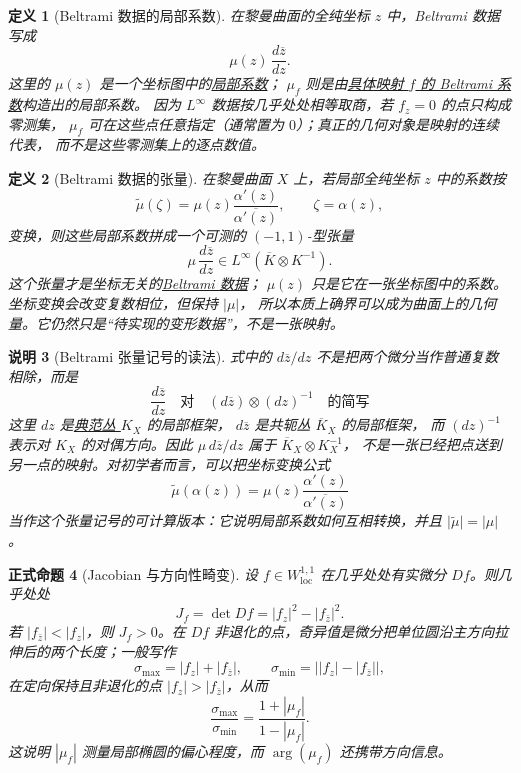 \documentclass[UTF8,fontset=none,a4paper,11pt]{ctexart}
\theoremstyle{foundation-definition}
\newtheorem{definition}{定义}[section]
\theoremstyle{foundation-theorem}
\theoremstyle{foundation-proposition}
\newtheorem{proposition}[definition]{正式命题}
\theoremstyle{foundation-example}
\theoremstyle{foundation-remark}
\newtheorem{remark}[definition]{说明}
\theoremstyle{foundation-theorem}
\newcommand{\term}[2]{\hyperref[#1]{#2}}
\begin{document}
\begin{definition}[Beltrami 数据的局部系数]\label{def:beltrami-differential}
在黎曼曲面的全纯坐标 \(z\) 中，Beltrami 数据写成
\[
\mu(z)\,\frac{d\overline z}{dz}.
\]
这里的 \(\mu(z)\) 是一个坐标图中的\term{def:beltrami-differential}{局部系数}；
\(\mu_f\) 则是由\term{def:map-beltrami-coefficient}{具体映射 \(f\) 的 Beltrami 系数}构造出的局部系数。
因为 \(L^\infty\) 数据按几乎处处相等取商，若 \(f_z=0\) 的点只构成零测集，
\(\mu_f\) 可在这些点任意指定（通常置为 \(0\)）；真正的几何对象是映射的连续代表，
而不是这些零测集上的逐点数值。
\end{definition}

\begin{definition}[Beltrami 数据的张量]\label{def:beltrami-tensor}
在黎曼曲面 \(X\) 上，若局部全纯坐标 \(z\) 中的系数按
\[
\widetilde\mu(\zeta)
=\mu(z)\frac{\alpha'(z)}{\overline{\alpha'(z)}},
\qquad \zeta=\alpha(z),
\]
变换，则这些局部系数拼成一个可测的 \((-1,1)\)-型张量
\[
\mu\,\frac{d\overline z}{dz}\in
L^\infty(\overline K\otimes K^{-1}).
\]
这个张量才是坐标无关的\term{def:beltrami-tensor}{Beltrami 数据}；
\(\mu(z)\) 只是它在一张坐标图中的系数。坐标变换会改变复数相位，但保持 \(|\mu|\)，
所以本质上确界可以成为曲面上的几何量。它仍然只是“待实现的变形数据”，不是一张映射。
\end{definition}

\begin{remark}[Beltrami 张量记号的读法]\label{rem:beltrami-tensor-notation}
式中的
\(d\overline z/dz\) 不是把两个微分当作普通复数相除，而是
\[
\frac{d\overline z}{dz}
\quad\text{对}\quad
(d\overline z)\otimes(dz)^{-1}
\quad\text{的简写}
\]
这里 \(dz\) 是\term{def:line-bundle}{典范丛 \(K_X\)} 的局部框架，
\(d\overline z\) 是共轭丛 \(\overline K_X\) 的局部框架，
而 \((dz)^{-1}\) 表示对 \(K_X\) 的对偶方向。因此
\(\mu\,d\overline z/dz\) 属于 \(\overline K_X\otimes K_X^{-1}\)，
不是一张已经把点送到另一点的映射。对初学者而言，可以把坐标变换公式
\[
\widetilde\mu(\alpha(z))
 =\mu(z)\frac{\alpha'(z)}{\overline{\alpha'(z)}}
\]
当作这个张量记号的可计算版本：它说明局部系数如何互相转换，并且
\(\lvert\widetilde\mu\rvert=\lvert\mu\rvert\)。
\end{remark}

\begin{proposition}[Jacobian 与方向性畸变]\label{prop:jacobian-distortion}
设 \(f\in W^{1,1}_{\mathrm{loc}}\) 在几乎处处有实微分 \(Df\)。则几乎处处
\[
J_f=\det Df=|f_z|^2-|f_{\bar z}|^2.
\]
若 \(|f_{\bar z}|<|f_z|\)，则 \(J_f>0\)。在 \(Df\) 非退化的点，奇异值是微分把单位圆沿主方向拉伸后的两个长度；一般写作
\[
\sigma_{\max}=|f_z|+|f_{\bar z}|,
\qquad
\sigma_{\min}=\bigl||f_z|-|f_{\bar z}|\bigr|,
\]
在定向保持且非退化的点 \(|f_z|>|f_{\bar z}|\)，从而
\[
\frac{\sigma_{\max}}{\sigma_{\min}}
=\frac{1+|\mu_f|}{1-|\mu_f|}.
\]
这说明 \(|\mu_f|\) 测量局部椭圆的偏心程度，而 \(\arg(\mu_f)\) 还携带方向信息。
\end{proposition}
\end{document}
